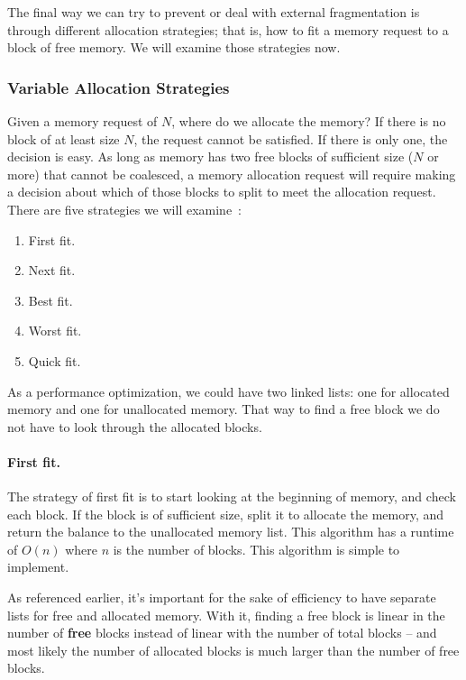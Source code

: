 The final way we can try to prevent or deal with external fragmentation is through different allocation strategies; that is, how to fit a memory request to a block of free memory. We will examine those strategies now.

\subsubsection*{Variable Allocation Strategies}

Given a memory request of $N$, where do we allocate the memory? If there is no block of at least size $N$, the request cannot be satisfied. If there is only one, the decision is easy. As long as memory has two free blocks of sufficient size ($N$ or more) that cannot be coalesced, a memory allocation request will require making a decision about which of those blocks to split to meet the allocation request. There are five strategies we will examine~\cite{mte241}:

\begin{enumerate}
	\item First fit.
	\item Next fit.
	\item Best fit.
	\item Worst fit.
	\item Quick fit.
\end{enumerate}

As a performance optimization, we could have two linked lists: one for allocated memory and one for unallocated memory. That way to find a free block we do not have to look through the allocated blocks.

\paragraph{First fit.} The strategy of first fit is to start looking at the beginning of memory, and check each block. If the block is of sufficient size, split it to allocate the memory, and return the balance to the unallocated memory list. This algorithm has a runtime of $O(n)$ where $n$ is the number of blocks. This algorithm is simple to implement. 

As referenced earlier, it's important for the sake of efficiency to have separate lists for free and allocated memory. With it, finding a free block is linear in the number of \textbf{free} blocks instead of linear with the number of total blocks -- and most likely the number of allocated blocks is much larger than the number of free blocks.

